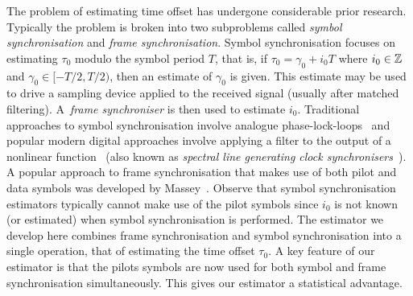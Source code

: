 \documentclass[journal]{IEEEtranTCOM}
\begin{document}

The problem of estimating time offset has undergone considerable prior research.  Typically the problem is broken into two subproblems called \emph{symbol synchronisation} and \emph{frame synchronisation}.  Symbol synchronisation focuses on estimating $\tau_0$ modulo the symbol period $T$, that is, if $\tau_0 = \gamma_0 + i_0T$ where $i_0 \in {\mathbb Z}$ and $\gamma_0 \in [-T/2, T/2)$, then an estimate of $\gamma_0$ is given.  This estimate may be used to drive a sampling device applied to the received signal (usually after matched filtering).  A~\emph{frame synchroniser} is then used to estimate $i_0$.  Traditional approaches to symbol synchronisation involve analogue phase-lock-loops~\cite{WilliamPLL1998,Meyr_synchro_book_1998,Tavares_PLL_symb_timer_2000} and popular modern digital approaches involve applying a filter to the output of a nonlinear function~\cite{Oerder_synch_square_circstat_1988,Morelli_symbtime_feedforward_1997,Panayirci_eval_per_symbtim_1996,YikChung_universal_anal_feedforward_2006,Wang_alt_lee_sybtiming_2003,Lee_more_feedforward_two_symbol_2002,Grimm_real_time_imp_timing_1998} (also known as \emph{spectral line generating clock synchronisers}~\cite[Sec.~2.4]{Meyr_synchro_book_1998}).  A popular approach to frame synchronisation that makes use of both pilot and data symbols was developed by Massey~\cite{Massey1972optimumframe,Nielsen_onmassey_1973,Robertson_frame_sync_phd_1995}.  Observe that symbol synchronisation estimators typically cannot make use of the pilot symbols since $i_0$ is not known (or estimated) when symbol synchronisation is performed.  The estimator we develop here combines frame synchronisation and symbol synchronisation into a single operation, that of estimating the time offset $\tau_0$.  A key feature of our estimator is that the pilots symbols are now used for both symbol and frame synchronisation simultaneously.  This gives our estimator a statistical advantage.
\end{document}
